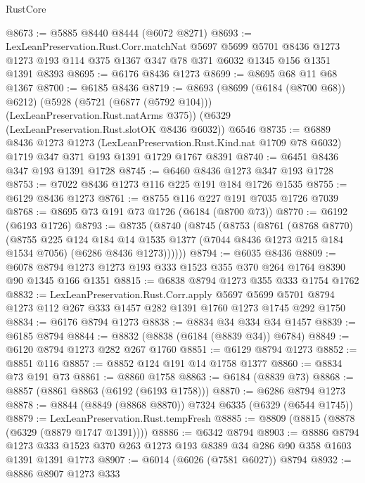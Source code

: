 \begin{lexlean}{RustCore}
\begin{coremodule}
{\begin{coremodule}
{{{{{{{{{{{{{{{{{{{{{{{{{{{{{{{{{{{{{{{{{{{{@8673 := @5885 @8440 @8444 (@6072 @8271)
@8693 := LexLeanPreservation.Rust.Corr.matchNat
    @5697
    @5699
    @5701
    @8436
    @1273
    @1273
    @193
    @114
    @375
    @1367
    @347
    @78
    @371
    @6032
    @1345
    @156
    @1351
    @1391
    @8393
@8695 := @6176 @8436 @1273
@8699 := @8695 @68 @11 @68 @1367
@8700 := @6185 @8436
@8719 := @8693
    (@8699 (@6184 (@8700 @68)) @6212)
    (@5928 (@5721 (@6877 (@5792 @104))) (LexLeanPreservation.Rust.natArms @375))
    (@6329 (LexLeanPreservation.Rust.slotOK @8436 @6032))
    @6546
@8735 := @6889
    @8436
    @1273
    @1273
    (LexLeanPreservation.Rust.Kind.nat @1709 @78 @6032)
    @1719
    @347
    @371
    @193
    @1391
    @1729
    @1767
    @8391
@8740 := @6451 @8436 @347 @193 @1391 @1728
@8745 := @6460 @8436 @1273 @347 @193 @1728
@8753 := @7022 @8436 @1273 @116 @225 @191 @184 @1726 @1535
@8755 := @6129 @8436 @1273
@8761 := @8755 @116 @227 @191 @7035 @1726 @7039
@8768 := @8695 @73 @191 @73 @1726 (@6184 (@8700 @73))
@8770 := @6192 (@6193 @1726)
@8793 := @8735
    (@8740
      (@8745
        (@8753
          (@8761
            (@8768 @8770)
            (@8755
              @225
              @124
              @184
              @14
              @1535
              @1377
              (@7044 @8436 @1273 @215 @184 @1534 @7056)
              (@6286 @8436 @1273))))))
@8794 := @6035 @8436
@8809 := @6078 @8794 @1273 @1273 @193 @333 @1523 @355 @370 @264 @1764 @8390 @90 @1345 @166 @1351
@8815 := @6838 @8794 @1273 @355 @333 @1754 @1762
@8832 := LexLeanPreservation.Rust.Corr.apply
    @5697
    @5699
    @5701
    @8794
    @1273
    @112
    @267
    @333
    @1457
    @282
    @1391
    @1760
    @1273
    @1745
    @292
    @1750
@8834 := @6176 @8794 @1273
@8838 := @8834 @34 @334 @34 @1457
@8839 := @6185 @8794
@8844 := @8832 (@8838 (@6184 (@8839 @34)) @6784)
@8849 := @6120 @8794 @1273 @282 @267 @1760
@8851 := @6129 @8794 @1273
@8852 := @8851 @116
@8857 := @8852 @124 @191 @14 @1758 @1377
@8860 := @8834 @73 @191 @73
@8861 := @8860 @1758
@8863 := @6184 (@8839 @73)
@8868 := @8857 (@8861 @8863 (@6192 (@6193 @1758)))
@8870 := @6286 @8794 @1273
@8878 := @8844 (@8849 (@8868 @8870)) @7324 @6335 (@6329 (@6544 @1745))
@8879 := LexLeanPreservation.Rust.tempFresh
@8885 := @8809 (@8815 (@8878 (@6329 (@8879 @1747 @1391))))
@8886 := @6342 @8794
@8903 := @8886
    @8794
    @1273
    @333
    @1523
    @370
    @263
    @1273
    @193
    @8389
    @34
    @286
    @90
    @358
    @1603
    @1391
    @1391
    @1773
@8907 := @6014 (@6026 (@7581 @6027)) @8794
@8932 := @8886
    @8907
    @1273
    @333
}}}}}}}}}}}}}}}}}}}}}}}}}}}}}}}}}}}}}}}}}}}}
\end{coremodule}}
\end{coremodule}
\end{lexlean}
